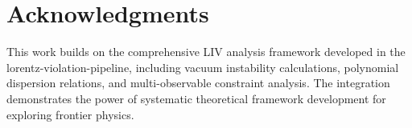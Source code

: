 \documentclass[12pt]{article}
\begin{document}
\section*{Acknowledgments}

This work builds on the comprehensive LIV analysis framework developed in the lorentz-violation-pipeline, including vacuum instability calculations, polynomial dispersion relations, and multi-observable constraint analysis. The integration demonstrates the power of systematic theoretical framework development for exploring frontier physics.



\end{document}
